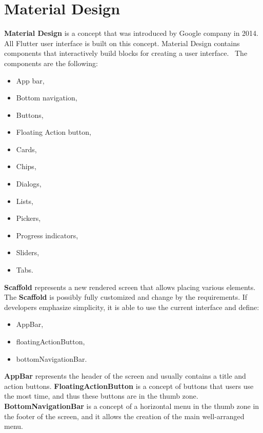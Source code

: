 \section{Material Design}\label{sec:android-specific-ui-widgets}
\textbf{Material Design} is a concept that was introduced by Google company in 2014.~\cite{materialDesignArticle}
All Flutter user interface is built on this concept.
Material Design contains components that interactively build blocks for creating a user interface.~\cite{materialDesign}
The components are the following:
\begin{itemize}
    \item App bar,
    \item Bottom navigation,
    \item Buttons,
    \item Floating Action button,
    \item Cards,
    \item Chips,
    \item Dialogs,
    \item Lists,
    \item Pickers,
    \item Progress indicators,
    \item Sliders,
    \item Tabs.
\end{itemize}

\textbf{Scaffold} represents a new rendered screen that allows placing various elements.
The \textbf{Scaffold} is possibly fully customized and change by the requirements.
If developers emphasize simplicity, it is able to use the current interface and define:
\begin{itemize}
    \item AppBar,
    \item floatingActionButton,
    \item bottomNavigationBar.
\end{itemize}
\textbf{AppBar} represents the header of the screen and usually contains a title and action buttons.
\textbf{FloatingActionButton} is a concept of buttons that users use the most time, and thus these buttons are in the thumb zone.
\textbf{BottomNavigationBar} is a concept of a horizontal menu in the thumb zone in the footer of the screen, and it allows the creation of the main well-arranged menu.~\cite{flutterBook}
\newline
\newline

